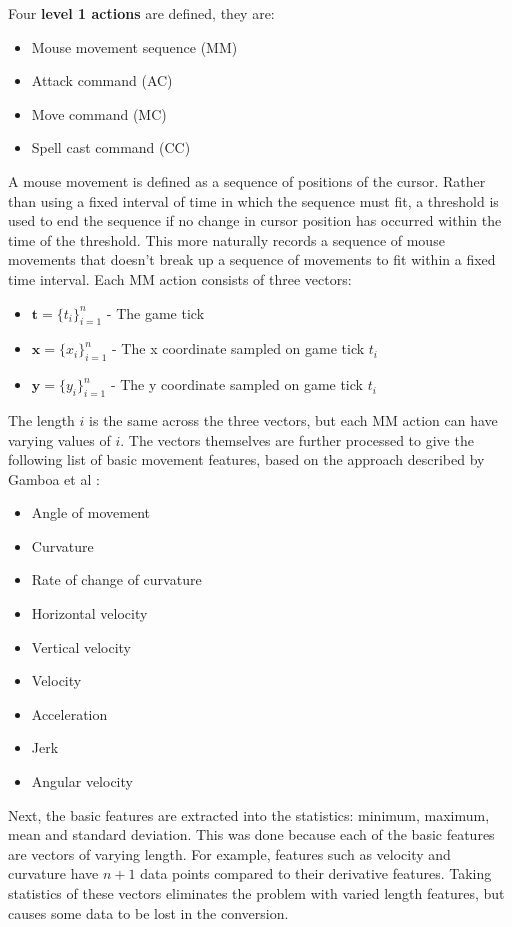\documentclass{../sty/SizheArticle}
\begin{document}
Four \textbf{level 1 actions} are defined, they are:
\begin{itemize}
\item Mouse movement sequence (MM)
\item Attack command (AC)
\item Move command (MC)
\item Spell cast command (CC)
\end{itemize}
A mouse movement is defined as a sequence of positions of the cursor. Rather than using a fixed interval of time in which the sequence must fit, a threshold is used to end the sequence if no change in cursor position has occurred within the time of the threshold. This more naturally records a sequence of mouse movements that doesn't break up a sequence of movements to fit within a fixed time interval. Each MM action consists of three vectors:
\begin{itemize}
\item $\boldsymbol{t} = \{t_i\}^{n}_{i=1}$ - The game tick
\item $\boldsymbol{x} = \{x_i\}^{n}_{i=1}$ - The x coordinate sampled on game tick $t_i$
\item $\boldsymbol{y} = \{y_i\}^{n}_{i=1}$ - The y coordinate sampled on game tick $t_i$
\end{itemize}
The length $i$ is the same across the three vectors, but each MM action can have varying values of $i$. The vectors themselves are further processed to give the following list of basic movement features, based on the approach described by Gamboa et al \cite{mouse-features}:
\begin{itemize}
\item Angle of movement
\item Curvature
\item Rate of change of curvature
\item Horizontal velocity
\item Vertical velocity
\item Velocity
\item Acceleration
\item Jerk
\item Angular velocity
\end{itemize}
Next, the basic features are extracted into the statistics: minimum, maximum, mean and standard deviation. This was done because each of the basic features are vectors of varying length. For example, features such as velocity and curvature have $n + 1$ data points compared to their derivative features. Taking statistics of these vectors eliminates the problem with varied length features, but causes some data to be lost in the conversion.
\end{document}
